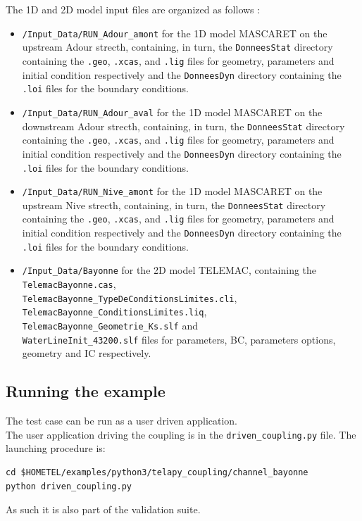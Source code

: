 The 1D and 2D model input files are organized as follows :
\begin{itemize}
\item \texttt{/Input\_Data/RUN\_Adour\_amont} for the 1D model
  MASCARET on the upstream Adour strecth, containing, in turn, the
  \texttt{DonneesStat} directory containing the \texttt{.geo}, \texttt{.xcas},
  and \texttt{.lig} files for geometry, parameters and initial
  condition respectively and the \texttt{DonneesDyn} directory
  containing the \texttt{.loi} files for the boundary conditions.
\item \texttt{/Input\_Data/RUN\_Adour\_aval} for the 1D model
  MASCARET on the downstream Adour strecth, containing, in turn, the
  \texttt{DonneesStat} directory containing the \texttt{.geo}, \texttt{.xcas},
  and \texttt{.lig} files for geometry, parameters and initial
  condition respectively and the \texttt{DonneesDyn} directory
  containing the \texttt{.loi} files for the boundary conditions.
\item \texttt{/Input\_Data/RUN\_Nive\_amont} for the 1D model
  MASCARET on the upstream Nive strecth, containing, in turn, the
  \texttt{DonneesStat} directory containing the \texttt{.geo}, \texttt{.xcas},
  and \texttt{.lig} files for geometry, parameters and initial
  condition respectively and the \texttt{DonneesDyn} directory
  containing the \texttt{.loi} files for the boundary conditions.
\item \texttt{/Input\_Data/Bayonne} for the 2D model TELEMAC,
  containing the \texttt{TelemacBayonne.cas},\\
  \texttt{TelemacBayonne\_TypeDeConditionsLimites.cli},\\
  \texttt{TelemacBayonne\_ConditionsLimites.liq},\\
  \texttt{TelemacBayonne\_Geometrie\_Ks.slf} and\\
  \texttt{WaterLineInit\_43200.slf} files for parameters,
  BC, parameters options, geometry and IC respectively.
\end{itemize}

\subsection{Running the example}

The test case can be run as a user
driven application.\\

The user application driving the coupling is in the
\texttt{driven\_coupling.py} file. The launching procedure is:
\begin{verbatim}
cd $HOMETEL/examples/python3/telapy_coupling/channel_bayonne
python driven_coupling.py
\end{verbatim}
As such it is also part of the validation suite.

